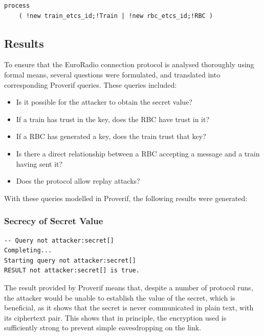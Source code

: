 \documentclass[twoside,11pt,a4paper]{article}
\begin{document}
\begin{verbatim}
process
	( !new train_etcs_id;!Train | !new rbc_etcs_id;!RBC )
\end{verbatim}

\subsection{Results}
To ensure that the EuroRadio connection protocol is analysed thoroughly using formal means, several questions were formulated, and translated into corresponding Proverif queries. These queries included:
\begin{itemize}[nolistsep]
\item Is it possible for the attacker to obtain the secret value?
\item If a train has trust in the key, does the RBC have trust in it?
\item If a RBC has generated a key, does the train trust that key?
\item Is there a direct relationship between a RBC accepting a message and a train having sent it?
\item Does the protocol allow replay attacks?
\end{itemize}

With these queries modelled in Proverif, the following results were generated:
\subsubsection{Secrecy of Secret Value}
\begin{verbatim}
-- Query not attacker:secret[]
Completing...
Starting query not attacker:secret[]
RESULT not attacker:secret[] is true.
\end{verbatim}
The result provided by Proverif means that, despite a number of protocol runs, the attacker would be unable to establish the value of the secret, which is beneficial, as it shows that the secret is never communicated in plain text, with its ciphertext pair. This shows that in principle, the encryption used is sufficiently strong to prevent simple eavesdropping on the link.
\end{document}
